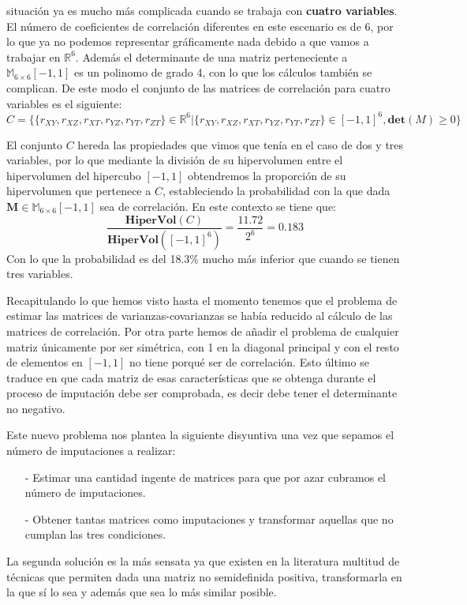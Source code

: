 \documentclass[a4paper,openright,12pt]{report}
\begin{document}
{\normalsizeLa situación ya es mucho más complicada cuando se trabaja con \textbf{cuatro variables}. El número de coeficientes de correlación diferentes en este escenario es de 6, por lo que ya no podemos representar gráficamente nada debido a que vamos a trabajar en $\mathbb{R}^6$. Además el determinante de una matriz perteneciente a $\mathbb{M}_{6\times  6}[-1,1]$ es un polinomo de grado 4, con lo que los cálculos también se complican. De este modo el conjunto de las matrices de correlación para cuatro variables es el siguiente:}
{\tiny $$C=\lbrace\lbrace r_{XY},r_{XZ},r_{XT},r_{YZ},r_{YT},r_{ZT} \rbrace \in \mathbb{R}^{6} \vert \lbrace r_{XY},r_{XZ},r_{XT},r_{YZ},r_{YT},r_{ZT} \rbrace \in [-1,1]^{6}, \mathbf{det}(M)\geq 0\rbrace$$}

El conjunto $C$ hereda las propiedades que vimos que tenía en el caso de dos y tres variables, por lo que mediante la división de su hipervolumen entre el hipervolumen del hipercubo $[-1,1]$ obtendremos la proporción de su hipervolumen que pertenece a $C$, estableciendo la probabilidad con la que dada $\mathbf{M}\in \mathbb{M}_{6\times  6}[-1,1]$ sea de correlación. En este contexto se tiene que:
$$\dfrac{\mathbf{HiperVol}(C)}{\mathbf{HiperVol}([-1,1]^{6})}=\dfrac{11.72}{2^{6}}= 0.183$$
Con lo que la probabilidad es del 18.3\% mucho más inferior que cuando se tienen tres variables. 

Recapitulando lo que hemos visto hasta el momento tenemos que el problema de estimar las matrices de varianzas-covarianzas se había reducido al cálculo de las matrices de correlación. Por otra parte hemos de añadir el problema de cualquier matriz únicamente por ser simétrica, con 1 en la diagonal principal y con el resto de elementos en $[-1,1]$ no tiene porqué ser de correlación. Esto último se traduce en que cada matriz de esas características que se obtenga durante el proceso de imputación debe ser comprobada, es decir debe tener el determinante no negativo.

Este nuevo problema nos plantea la siguiente disyuntiva una vez que sepamos el número de imputaciones a realizar:
\begin{itemize}
\item[-] Estimar una cantidad ingente de matrices para que por azar cubramos el número de imputaciones. 
\item[-] Obtener tantas matrices como imputaciones y transformar aquellas que no cumplan las tres condiciones.
\end{itemize}

La segunda solución es la más sensata ya que existen en la literatura multitud de técnicas que permiten dada una matriz no semidefinida positiva, transformarla en la que sí lo sea y además que sea lo más similar posible.
\newpage
\end{document}
